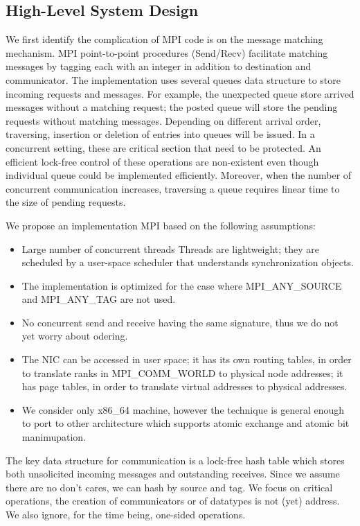 \documentclass{sig-alternate-05-2015}
\begin{document}
\subsection{High-Level System Design}
We first identify the complication of MPI code is on the message matching
mechanism. MPI point-to-point procedures (Send/Recv) facilitate matching
messages by tagging each with an integer in addition to destination and
communicator. The implementation uses several queues data structure to store
incoming requests and messages. For example, the unexpected queue store arrived
messages without a matching request; the posted queue will store the pending
requests without matching messages. Depending on different arrival order,
traversing, insertion or deletion of entries into queues will be issued. In a
concurrent setting, these are critical section that need to be protected. An
efficient lock-free control of these operations are non-existent even though
individual queue could be implemented efficiently.  Moreover, when the number
of concurrent communication increases, traversing a queue requires linear time
to the size of pending requests.

We propose an implementation MPI based on the following assumptions:
\begin{itemize}
  \item Large number of concurrent threads Threads are lightweight; they are
    scheduled by a user-space scheduler that understands synchronization
    objects.
  \item The implementation is optimized for the case where MPI_ANY_SOURCE and MPI_ANY_TAG are not used.
  \item No concurrent send and receive having the same signature, thus we do not yet worry about odering.
  \item The NIC can be accessed in user space; it has its own routing tables,
    in order to translate ranks in MPI\_COMM\_WORLD to physical node addresses;
    it has page tables, in order to translate virtual addresses to physical
    addresses.
  \item We consider only x86_64 machine, however the technique is general
    enough to port to other architecture which supports atomic exchange and
    atomic bit manimupation.
\end{itemize}

The key data structure for communication is a lock-free hash table which stores
both unsolicited incoming messages and outstanding receives. Since we assume
there are no don't cares, we can hash by source and tag. We focus on critical
operations, the creation of communicators or of datatypes is not (yet)
address. We also ignore, for the time being, one-sided operations.
\end{document}
